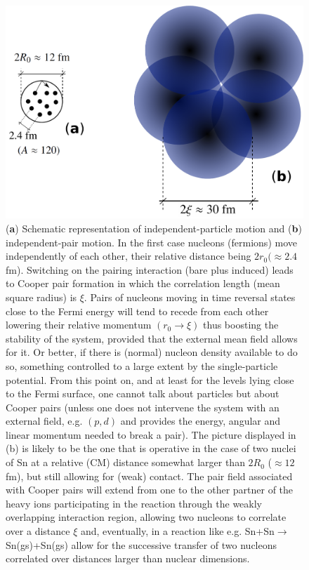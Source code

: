 \begin{figure}
\centerline{\includegraphics*[width=14cm,angle=0]{nutshell/figs/fig3_1_4.pdf}}
\caption{(\textbf{a}) Schematic representation of independent-particle motion and (\textbf{b}) independent-pair motion. In the first case nucleons (fermions) move independently of each other, their relative distance being $2r_0(\approx 2.4$ fm).  Switching on the pairing interaction (bare plus induced) leads to Cooper pair formation in which the correlation length (mean square radius) is $\xi$. Pairs of nucleons moving in time reversal states close to the Fermi energy will tend to recede from each other lowering their relative momentum $(r_0\rightarrow \xi)$ thus boosting the stability of the system, provided that the external mean field allows for it. Or better, if  there is (normal) nucleon density available to do so, something controlled to a large extent by the single-particle potential. From this point on, and at least for the levels lying close to the Fermi surface, one cannot talk about particles but about Cooper pairs (unless one does not intervene the system with an external field, e.g. $(p,d)$ and provides the energy, angular and linear momentum needed to break a pair). The picture displayed in (b) is likely to be the one that is operative in the case of two nuclei of Sn at a relative (CM) distance somewhat larger than $2R_0$ ($\approx 12$ fm), but still allowing for  (weak) contact. The pair field associated with  Cooper pairs will extend from one to the other partner of the heavy ions participating in the reaction through the weakly overlapping interaction region, allowing two nucleons to correlate over a distance $\xi$ and, eventually, in a reaction like e.g. Sn+Sn$\rightarrow$ Sn(gs)+Sn(gs) allow for the successive transfer of two nucleons correlated over distances larger than nuclear dimensions.}\label{fig3.2.1}
\end{figure}
